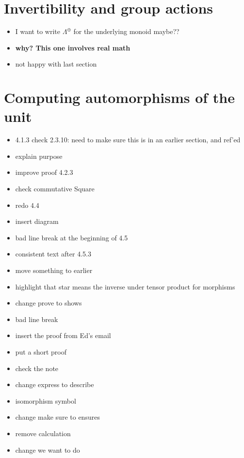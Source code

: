 \documentclass{amsart}
\begin{document}
\section{ Invertibility and group actions}

\begin{itemize}
\item I want to write $\Lambda^{\oplus}$ for the underlying monoid maybe??
\item \textbf{why? This one involves real math}
\item not happy with last section
\end{itemize}



\section{ Computing automorphisms of the unit}

\begin{itemize}




\item 4.1.3 check 2.3.10: need to make sure this is in an earlier section, and ref'ed


\item explain purpose
\item improve proof 4.2.3

\item check commutative Square

\item redo 4.4
\item insert diagram
\item bad line break at the beginning of 4.5
\item consistent text after 4.5.3
\item move something to earlier


\item highlight that star means the inverse under tensor product for morphisms
\item change prove to shows
\item bad line break
\item insert the proof from Ed's email
\item put a short proof
\item check the note
\item change express to describe
\item isomorphism symbol
\item change make sure to ensures
\item remove calculation
\item change we want to do
\end{itemize}
\end{document}

